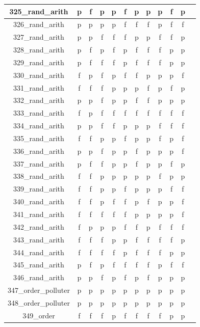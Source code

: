 \documentclass[
fancyheadings, %
%
%
]{stsreprt}
\begin{document}
\begin{longtable}{|c|c|c|c|c|c|c|c|c|c|c|c|}
\hline
325\_rand\_arith & p & f & p & p & f & p & p & p & f & p \\
\hline
326\_rand\_arith & p & p & p & p & f & f & f & p & f & f \\
\hline
327\_rand\_arith & p & p & f & f & f & p & p & f & f & p \\
\hline
328\_rand\_arith & p & f & p & f & p & f & f & f & p & p \\
\hline
329\_rand\_arith & p & f & f & f & p & f & f & f & p & p \\
\hline
330\_rand\_arith & f & p & f & p & f & f & p & p & p & f \\
\hline
331\_rand\_arith & f & f & f & p & p & p & f & p & f & p \\
\hline
332\_rand\_arith & p & p & f & p & p & f & f & p & p & p \\
\hline
333\_rand\_arith & f & p & f & f & f & f & f & f & f & f \\
\hline
334\_rand\_arith & p & p & f & f & p & p & p & f & f & f \\
\hline
335\_rand\_arith & f & f & p & p & f & p & p & f & p & f \\
\hline
336\_rand\_arith & p & p & f & p & p & f & p & p & p & f \\
\hline
337\_rand\_arith & p & f & f & p & p & f & p & p & f & p \\
\hline
338\_rand\_arith & f & f & p & p & p & p & p & f & p & p \\
\hline
339\_rand\_arith & f & f & p & p & f & p & p & p & f & f \\
\hline
340\_rand\_arith & f & f & p & f & f & p & f & p & p & f \\
\hline
341\_rand\_arith & f & f & f & f & f & p & p & p & p & f \\
\hline
342\_rand\_arith & f & p & p & p & f & f & p & f & f & f \\
\hline
343\_rand\_arith & f & f & f & p & p & f & f & f & f & p \\
\hline
344\_rand\_arith & f & f & f & f & p & f & f & f & p & p \\
\hline
345\_rand\_arith & p & f & p & f & f & f & f & p & f & f \\
\hline
346\_rand\_arith & p & p & f & p & f & p & f & p & p & p \\
\hline
347\_order\_polluter & p & p & p & p & p & p & p & p & p & p \\
\hline
348\_order\_polluter & p & p & p & p & p & p & p & p & p & p \\
\hline
349\_order & f & f & f & p & f & f & f & f & p & p \\

\end{longtable}
\end{document}
